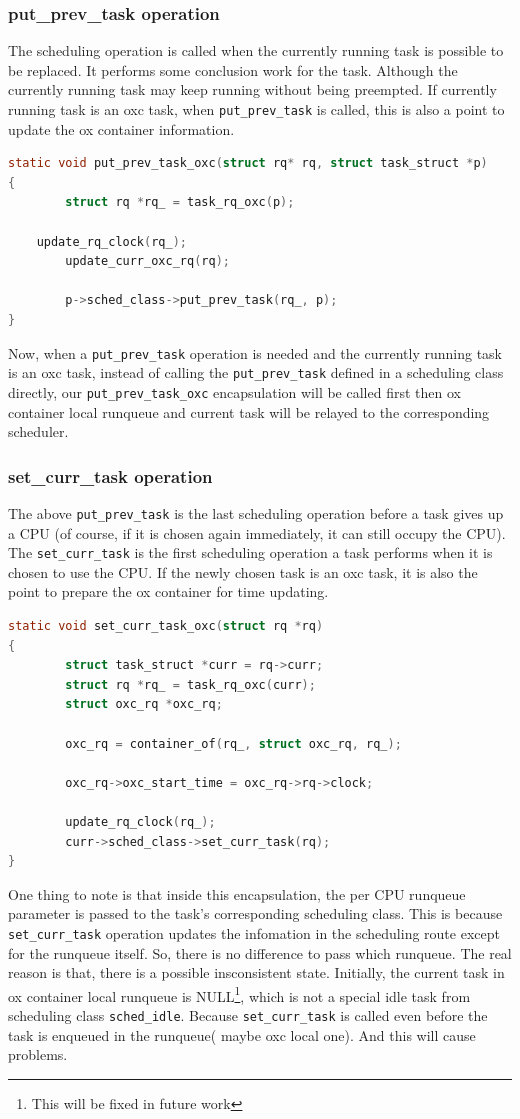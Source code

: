 \subsubsection{put\_prev\_task operation}
The scheduling operation is called when the currently running task is
possible to be replaced. It performs some conclusion work for the task.
Although the currently running task may keep running without being
preempted. If currently running task is an oxc task, when 
\texttt{put\_prev\_task} is called, this is also a point to update 
the ox container information. 
\begin{lstlisting}[language=C]
static void put_prev_task_oxc(struct rq* rq, struct task_struct *p)
{
        struct rq *rq_ = task_rq_oxc(p);

	update_rq_clock(rq_);
        update_curr_oxc_rq(rq);

        p->sched_class->put_prev_task(rq_, p);
}
\end{lstlisting}
Now, when a \texttt{put\_prev\_task} operation is needed and the
currently running task is an oxc task, instead of calling the 
\texttt{put\_prev\_task} defined in a scheduling class directly, our
\texttt{put\_prev\_task\_oxc} encapsulation will be called first then
ox container local runqueue and current task will be relayed to
the corresponding scheduler.

\subsubsection{set\_curr\_task operation}
The above \texttt{put\_prev\_task} is the last scheduling operation before 
a task gives up a CPU (of course, if it is chosen again immediately, it
can still occupy the CPU). The \texttt{set\_curr\_task} is the first 
scheduling operation a task performs when it is chosen to use the CPU.
If the newly chosen task is an oxc task, it is also the point to prepare
the ox container for time updating.
\begin{lstlisting}[language=C]
static void set_curr_task_oxc(struct rq *rq)
{
        struct task_struct *curr = rq->curr;
        struct rq *rq_ = task_rq_oxc(curr);
        struct oxc_rq *oxc_rq;

        oxc_rq = container_of(rq_, struct oxc_rq, rq_);

        oxc_rq->oxc_start_time = oxc_rq->rq->clock;

        update_rq_clock(rq_);
        curr->sched_class->set_curr_task(rq);
}
\end{lstlisting}
One thing to note is that inside this encapsulation, the per CPU runqueue
parameter is passed to the task's corresponding scheduling class. This is
because \texttt{set\_curr\_task} operation updates the infomation in the 
scheduling route except for the runqueue itself. So, there is no difference
to pass which runqueue. The real reason is that, there is a possible
insconsistent state. Initially, the current task in ox container local
runqueue is NULL\footnote{This will be fixed in future work}, which is not 
a special idle task from scheduling class \texttt{sched\_idle}. Because
\texttt{set\_curr\_task} is called even before the task is enqueued in the
runqueue( maybe oxc local one). And this will cause problems.

